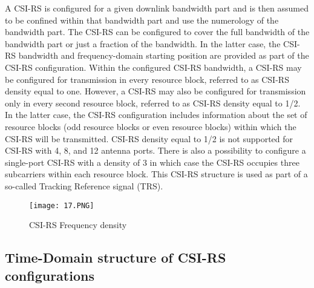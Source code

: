 A CSI-RS is configured for a given downlink bandwidth part and is then assumed to be confined within that bandwidth part and use the numerology of the bandwidth part.
\newline
The CSI-RS can be configured to cover the full bandwidth of the bandwidth part or just a fraction of the bandwidth. In the latter case, the CSI-RS bandwidth and frequency-domain starting position are provided as part of the CSI-RS configuration. 
\newline
Within the configured CSI-RS bandwidth, a CSI-RS may be configured for transmission in every resource block, referred to as CSI-RS density equal to one.
\newline
However, a CSI-RS may also be configured for transmission only in every second resource block, referred to as CSI-RS density equal to 1/2. In the latter case, the CSI-RS configuration includes information about the set of resource blocks (odd resource blocks or even resource blocks) within which the CSI-RS will be transmitted. CSI-RS density equal to 1/2 is not supported for CSI-RS with 4, 8, and 12 antenna ports.
\newline
There is also a possibility to configure a single-port CSI-RS with a density of 3 in which case the CSI-RS occupies three subcarriers within each resource block. This CSI-RS structure is used as part of a so-called Tracking Reference signal (TRS).

\begin{figure}[h]
\centering
\texttt{[image: 17.PNG]}
\caption{CSI-RS Frequency density }
\end{figure}

\subsection{Time-Domain structure of CSI-RS configurations}


